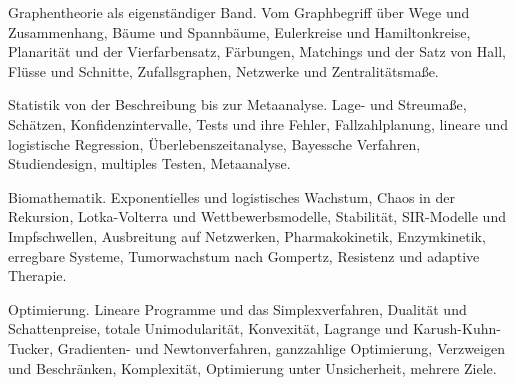 \begin{merksatz}
Graphentheorie als eigenständiger Band. Vom Graphbegriff über Wege und Zusammenhang, Bäume und Spannbäume, Eulerkreise und Hamiltonkreise, Planarität und der Vierfarbensatz, Färbungen, Matchings und der Satz von Hall, Flüsse und Schnitte, Zufallsgraphen, Netzwerke und Zentralitätsmaße.

\end{merksatz}

\begin{merksatz}
Statistik von der Beschreibung bis zur Metaanalyse. Lage- und Streumaße, Schätzen, Konfidenzintervalle, Tests und ihre Fehler, Fallzahlplanung, lineare und logistische Regression, Überlebenszeitanalyse, Bayessche Verfahren, Studiendesign, multiples Testen, Metaanalyse.

\end{merksatz}

\begin{merksatz}
Biomathematik. Exponentielles und logistisches Wachstum, Chaos in der Rekursion, Lotka-Volterra und Wettbewerbsmodelle, Stabilität, SIR-Modelle und Impfschwellen, Ausbreitung auf Netzwerken, Pharmakokinetik, Enzymkinetik, erregbare Systeme, Tumorwachstum nach Gompertz, Resistenz und adaptive Therapie.

\end{merksatz}

\begin{merksatz}
Optimierung. Lineare Programme und das Simplexverfahren, Dualität und Schattenpreise, totale Unimodularität, Konvexität, Lagrange und Karush-Kuhn-Tucker, Gradienten- und Newtonverfahren, ganzzahlige Optimierung, Verzweigen und Beschränken, Komplexität, Optimierung unter Unsicherheit, mehrere Ziele.

\end{merksatz}

